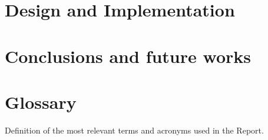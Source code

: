 \documentclass[ENG]{TFUOC}%
\begin{document}
\chapter{Design and Implementation}







\chapter{Conclusions and future works}



\chapter{Glossary}

Definition of the most relevant terms and acronyms used in the Report.

\end{document}
